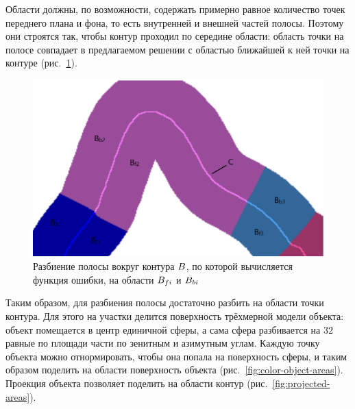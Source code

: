Области должны, по возможности, содержать примерно равное количество точек
переднего плана и фона, то есть внутренней и внешней частей полосы.
Поэтому они строятся так, чтобы контур проходил по середине области: область
точки на полосе совпадает в предлагаемом решении с областью ближайшей
к ней точки на контуре (рис.~\ref{fig:fb_contour}).

\begin{figure}[t]
    \centering
    \includegraphics[width=\textwidth]{fig/fb_contour.png}
    \caption{
        Разбиение полосы вокруг контура $B$, по которой вычисляется
        функция ошибки, на области $B_{fi}$ и $B_{bi}$
    }
    \label{fig:fb_contour}
\end{figure}

Таким образом, для разбиения полосы достаточно разбить на области точки контура.
Для этого на участки делится поверхность трёхмерной модели объекта: объект
помещается в центр единичной сферы, а сама сфера разбивается на $32$ равные по
площади части по зенитным и азимутным углам.
Каждую точку объекта можно отнормировать, чтобы она попала на поверхность
сферы, и таким образом поделить на области поверхность объекта
(рис.~\ref{fig:color-object-areas}).
Проекция объекта позволяет поделить на области контур
(рис.~\ref{fig:projected-areas}).

